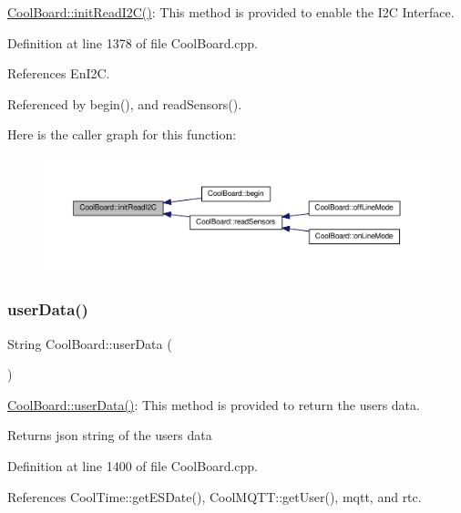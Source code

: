 \hyperlink{class_cool_board_a397b46fadab8f530a8cf4d914c561366}{Cool\+Board\+::init\+Read\+I2\+C()}\+: This method is provided to enable the I2C Interface. 

Definition at line 1378 of file Cool\+Board.\+cpp.



References En\+I2C.



Referenced by begin(), and read\+Sensors().

Here is the caller graph for this function\+:
\nopagebreak
\begin{figure}[H]
\begin{center}
\leavevmode
\includegraphics[width=350pt]{d7/df9/class_cool_board_a397b46fadab8f530a8cf4d914c561366_icgraph}
\end{center}
\end{figure}
\mbox{\label{class_cool_board_ae7358fb6e623cfc81b775f5f1734909b}} 
\subsubsection{\texorpdfstring{user\+Data()}{userData()}}
{\footnotesize\ttfamily String Cool\+Board\+::user\+Data (\begin{DoxyParamCaption}{ }\end{DoxyParamCaption})}

\hyperlink{class_cool_board_ae7358fb6e623cfc81b775f5f1734909b}{Cool\+Board\+::user\+Data()}\+: This method is provided to return the user\textquotesingle{}s data.

\begin{DoxyReturn}{Returns}
json string of the user\textquotesingle{}s data 
\end{DoxyReturn}


Definition at line 1400 of file Cool\+Board.\+cpp.



References Cool\+Time\+::get\+E\+S\+Date(), Cool\+M\+Q\+T\+T\+::get\+User(), mqtt, and rtc.



